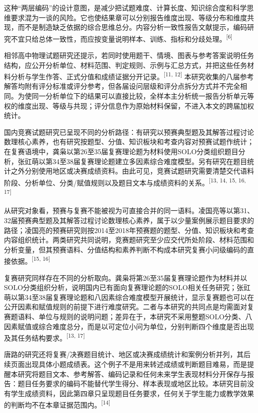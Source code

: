 \documentclass[
  12pt,
  a4paper,twoside,openany]{ctexbook}
\begin{document}
这种``两层编码''的设计意图，是减少把试题难度、计算长度、知识综合度和科学思维要求混为一谈的风险。它也使结果章可以分别报告维度出现、等级分布和维度共现，而不是制造缺乏依据的综合思维总分。内容分析一致性报告文献提示，编码研究不宜只给总体一致性，而应按变量说明样本、训练、指标和分歧处理。\textsuperscript{[6]}

相邻高中物理试题研究还提示，若同时使用题干、情境、图表与参考答案说明任务结构，应公开分析单位、材料范围、判定规则、示例与汇总方式，并把这些任务材料分析与学生作答、正式分值和成绩证据分开记录。\textsuperscript{[11, 12]}
本研究收集的八届参考解答均附有评分标准或评分参考，但各届设问层级和评分点拆分方式并不完全相同。为使同一分析单位下的结果可以直接比较，全样本主分析统一报告分析单元等权的维度出现、等级与共现；评分信息作为原始材料保留，不进入本文的跨届加权统计。

国内竞赛试题研究已呈现不同的分析路径：有研究以预赛典型题及其解答过程讨论数理核心素养，也有研究按题型、分值、知识板块和考查内容对预赛试题作统计；在复赛语境中，龚枭以第26至35届复赛理论题为材料使用SOLO分类组织题目分析，张豇萌以第34至38届复赛理论题建立多因素综合难度模型。另有研究在题目统计之外分别使用地区或决赛成绩资料。由此可见，竞赛试题研究需要清楚交代语料阶段、分析单位、分类/赋值规则以及题目文本与成绩资料的关系。\textsuperscript{[13, 14, 15, 16, 17]}

从研究对象看，预赛与复赛不能被视为可直接合并的同一语料。凌国亮等以第31、32届预赛典型题及其解答过程讨论数理核心素养，属于以少量案例展示题目要求的路径；凌国亮的预赛研究则按2014至2018年预赛题的题型、分值、知识板块和考查内容组织统计。两类研究共同说明，竞赛题研究至少应交代所处阶段、材料范围和分析变量，但其预赛语料、分值结构和素养判断不构成本研究复赛小问级编码的直接依据。\textsuperscript{[15, 16]}

复赛研究同样存在不同的分析取向。龚枭将第26至35届复赛理论题作为材料并以SOLO分类组织分析，说明国内已有面向复赛理论题的SOLO相关任务研究；张豇萌以第34至38届复赛理论题和八因素综合难度模型开展统计，显示复赛题也可以在公开因素和赋值规则的前提下进行难度研究。二者与本研究的共同点是均需面对复赛题语料、单位与规则的说明问题；差异在于，本研究不采用整题SOLO分类、八因素赋值或综合难度总分，而是以可定位小问为单位，分别判断四个维度是否出现及其任务结构要求。\textsuperscript{[13, 17]}

唐路的研究还将复赛/决赛题目统计、地区或决赛成绩统计和案例分析并列，其后续页面出现具体小题成绩表。这个例子不是用来转述成绩或判断题目难易，而是提醒本研究将题目文本、参考解答、编码记录和任何未来学生表现材料分开保存与报告：题目任务要求的编码不能替代学生得分、样本表现或地区比较。本研究目前没有学生成绩资料，因此第四章只呈现题目任务要求，任何关于学生能力或教学效果的判断均不在本章证据范围内。\textsuperscript{[14]}
\end{document}
